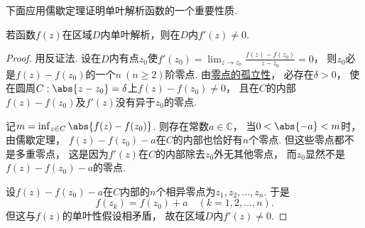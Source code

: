 下面应用儒歇定理证明单叶解析函数的一个重要性质.
\begin{theorem}%
若函数\(f(z)\)在区域\(D\)内单叶解析，则在\(D\)内\(f'(z)\neq0\).
\begin{proof}
用反证法.
设在\(D\)内有点\(z_0\)使\(f'(z_0)=\lim_{z \to z_0} \frac{f(z)-f(z_0)}{z-z_0}=0\)，
则\(z_0\)必是\(f(z)-f(z_0)\)的一个\(n\ (n\geq2)\)阶零点.
由\hyperref[theorem:解析函数的级数表示.解析函数的零点的孤立性]{零点的孤立性}，
必存在\(\delta>0\)，
使在圆周\(C: \abs{z-z_0}=\delta\)上\(f(z)-f(z_0)\neq0\)，
且在\(C\)的内部\(f(z)-f(z_0)\)及\(f'(z)\)没有异于\(z_0\)的零点.

记\(m = \inf_{z \in C} \abs{f(z) - f(z_0)}\).
则存在常数\(a\in\mathbb{C}\)，
当\(0<\abs{-a}<m\)时，
由儒歇定理，
\(f(z)-f(z_0)-a\)在\(C\)的内部也恰好有\(n\)个零点.
但这些零点都不是多重零点，
这是因为\(f'(z)\)在\(C\)的内部除去\(z_0\)外无其他零点，
而\(z_0\)显然不是\(f(z)-f(z_0)-a\)的零点.

设\(f(z)-f(z_0)-a\)在\(C\)内部的\(n\)个相异零点为\(z_1,z_2,\dotsc,z_n\).
于是\begin{equation*}
	f(z_k) = f(z_0) + a \quad(k=1,2,\dotsc,n).
\end{equation*}
但这与\(f(z)\)的单叶性假设相矛盾，
故在区域\(D\)内\(f'(z)\neq0\).
\end{proof}
\end{theorem}

